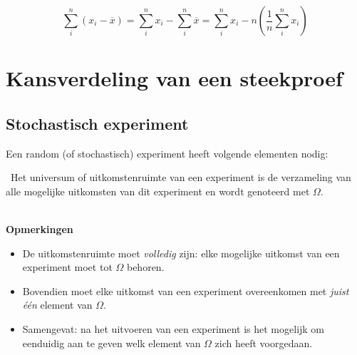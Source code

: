 \begin{equation}
 \sum_{i}^{n}(x_{i} - \overline{x}) = \sum_{i}^{n}x_{i} - \sum_{i}^{n}\overline{x} = \sum_{i}^{n}x_{i} - n (\frac{1}{n}\sum_{i}^{n} x_{i})
\label{eq:sumGemid}
\end{equation}

\section{Kansverdeling van een steekproef}
\subsection{Stochastisch experiment}
Een random (of stochastisch) experiment heeft volgende elementen nodig:

\begin{definition}\
 Het universum of uitkomstenruimte van een experiment
is de verzameling van alle mogelijke uitkomsten van dit experiment en
wordt genoteerd met $\Omega$.
\end{definition}
~\\
\textbf{Opmerkingen}
\begin{itemize}
\item De uitkomstenruimte moet \emph{volledig}\/ zijn: elke mogelijke
uitkomst van een experiment moet tot $\Omega$ behoren.
\item Bovendien moet elke
uitkomst van een experiment overeenkomen met \emph{juist \'e\'en}\/ element van
$\Omega$.
\item Samengevat: na het uitvoeren van een experiment is het  mogelijk  om eenduidig
aan te geven welk element van $\Omega$ zich heeft voorgedaan.
\end{itemize}

